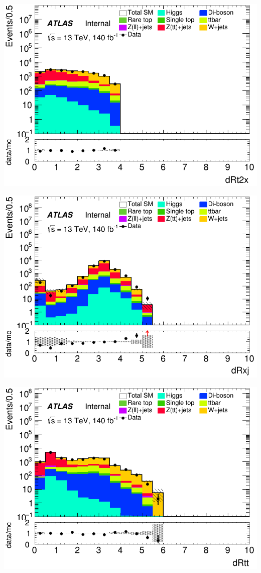 \documentclass[usenames,dvipsnames]{beamer}
\begin{document}
\begin{frame}
    \begin{minipage}{0.32\textwidth}
        \centering
        \includegraphics[width=\textwidth]{graphics/HH_met/HH_met_dRt2x.png}
    \end{minipage}
    \hfill
    \begin{minipage}{0.32\textwidth}
        \centering
        \includegraphics[width=\textwidth]{graphics/HH_met/HH_met_dRxj.png}
    \end{minipage}
    \hfill
    \begin{minipage}{0.32\textwidth}
        \centering
        \includegraphics[width=\textwidth]{graphics/HH_met/HH_met_dRtt.png}

\end{minipage}
\end{frame}
\end{document}
